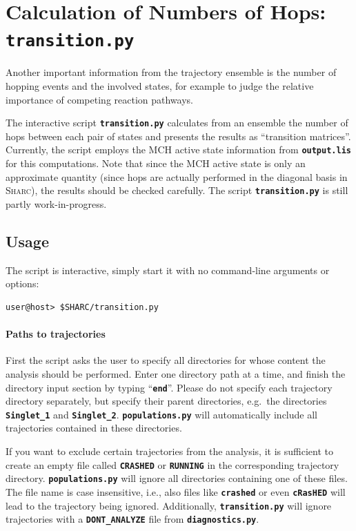 \documentclass[a4paper,10pt,DIV=15,openany]{scrbook}
\newcommand{\ttt}[1]{\textbf{\texttt{#1}}}
\begin{document}

\section{Calculation of Numbers of Hops: \ttt{transition.py}}\label{sec:transition.py}

Another important information from the trajectory ensemble is the number of hopping events and the involved states, for example to judge the relative importance of competing reaction pathways.

The interactive script \ttt{transition.py} calculates from an ensemble the number of hops between each pair of states and presents the results as ``transition matrices''.
Currently, the script employs the MCH active state information from \ttt{output.lis} for this computations. 
Note that since the MCH active state is only an approximate quantity (since hops are actually performed in the diagonal basis in \textsc{Sharc}), the results should be checked carefully.
The script \ttt{transition.py} is still partly work-in-progress.

\subsection{Usage}

The script is interactive, simply start it with no command-line arguments or options:
\begin{verbatim}
user@host> $SHARC/transition.py
\end{verbatim}

\paragraph{Paths to trajectories}

First the script asks the user to specify all directories for whose content the analysis should be performed. Enter one directory path at a time, and finish the directory input section by typing ``\ttt{end}''. Please do not specify each trajectory directory separately, but specify their parent directories, e.g.\ the directories \ttt{Singlet\_1} and \ttt{Singlet\_2}. \ttt{populations.py} will automatically include all trajectories contained in these directories.

If you want to exclude certain trajectories from the analysis, it is sufficient to create an empty file called \ttt{CRASHED} or \ttt{RUNNING} in the corresponding trajectory directory. \ttt{populations.py} will ignore all directories containing one of these files. The file name is case insensitive, i.e., also files like \ttt{crashed} or even \ttt{cRasHED} will lead to the trajectory being ignored.
Additionally, \ttt{transition.py} will ignore trajectories with a \ttt{DONT\_ANALYZE} file from \ttt{diagnostics.py}.
\end{document}
